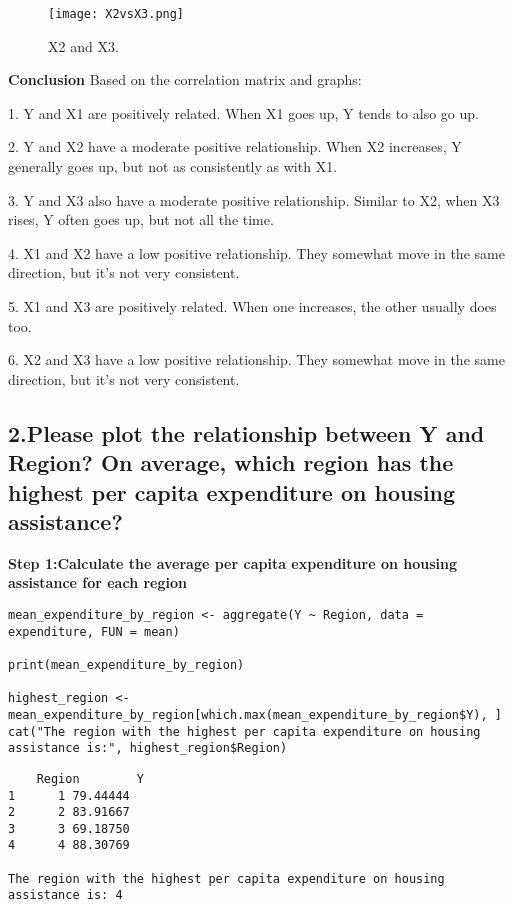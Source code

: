 \documentclass[12pt]{article}
\begin{document}
\begin{figure}[h!]\centering
	\caption{\footnotesize  X2 and X3.}
	\label{fig:plot_1}
	\texttt{[image: X2vsX3.png]}
\end{figure}

\newpage
\textbf{Conclusion }
Based on the correlation matrix and graphs:

1. Y and X1 are positively related. When X1 goes up, Y tends to also go up.
  
2. Y and X2 have a moderate positive relationship. When X2 increases, Y generally goes up, but not as consistently as with X1.

3. Y and X3 also have a moderate positive relationship. Similar to X2, when X3 rises, Y often goes up, but not all the time.

4. X1 and X2 have a low positive relationship. They somewhat move in the same direction, but it's not very consistent.

5. X1 and X3 are positively related. When one increases, the other usually does too.

6. X2 and X3 have a low positive relationship. They somewhat move in the same direction, but it's not very consistent.



\subsection*{2.Please plot the relationship between Y and Region? On average, which region has the
highest per capita expenditure on housing assistance?}


\textbf{Step 1:Calculate the average per capita expenditure on housing assistance for each region}
\begin{lstlisting}[style = my]
mean_expenditure_by_region <- aggregate(Y ~ Region, data = expenditure, FUN = mean)

print(mean_expenditure_by_region)

highest_region <- mean_expenditure_by_region[which.max(mean_expenditure_by_region$Y), ]
cat("The region with the highest per capita expenditure on housing assistance is:", highest_region$Region)

\end{lstlisting}

\newpage
\begin{verbatim}
    Region        Y
1      1 79.44444
2      2 83.91667
3      3 69.18750
4      4 88.30769 

The region with the highest per capita expenditure on housing assistance is: 4

\end{verbatim}
\end{document}
